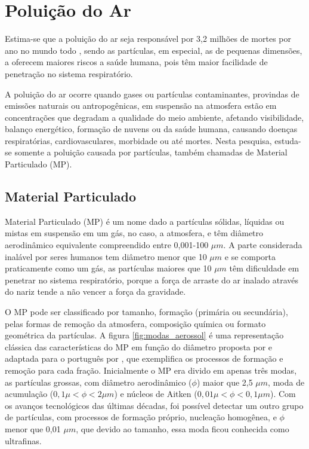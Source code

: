 \newpage
\section{Poluição do Ar}

Estima-se que a poluição do ar seja responsável por 3,2 milhões de mortes 
por ano no mundo todo \citep{lim2013}, sendo as partículas, em especial, as 
de pequenas dimensões, a oferecem maiores riscos a saúde humana, pois têm 
maior facilidade de penetração no sistema respiratório.

A poluição do ar ocorre quando gases ou partículas contaminantes, 
provindas de emissões naturais ou antropogênicas, 
em suspensão na atmosfera estão em concentrações que degradam 
a qualidade do meio ambiente, afetando visibilidade, balanço energético, 
formação de nuvens ou da saúde humana, causando doenças respiratórias, 
cardiovasculares, morbidade ou até mortes. Nesta pesquisa, estuda-se somente 
a poluição causada por partículas, também chamadas de Material Particulado (MP).

\subsection{Material Particulado}

Material Particulado (MP) é um nome dado a partículas sólidas, líquidas ou 
mistas em suspensão em um gás, no caso, a atmosfera, e têm diâmetro 
aerodinâmico equivalente compreendido entre 0,001-100 $\mu m$. A parte 
considerada inalável por seres humanos tem diâmetro menor que 10 $\mu m$
e se comporta praticamente como um gás, as partículas maiores que 10 $\mu m$ 
têm dificuldade em penetrar no sistema respiratório, porque a força de arraste 
do ar inalado através do nariz tende a não vencer a força da gravidade.

O MP pode ser classificado por tamanho, formação (primária ou secundária), 
pelas formas de remoção da atmosfera, composição química ou formato 
geométrica da partículas\citep{seinfeld2012}. A figura \ref{fig:modas_aerossol} 
é uma representação clássica das características 
do MP em função do diâmetro proposta por \citet{finlayson1999} e adaptada 
para o português por \citet{oliveira2007}, que exemplifica os processos de 
formação e remoção para cada fração. Inicialmente o MP era divido em apenas 
três modas, as partículas grossas, com  diâmetro  aerodinâmico ($\phi$) 
maior que 2,5 $\mu m$, moda de acumulação ($ 0,1\mu <\phi< 2\mu m$) e 
núcleos de Aitken ($ 0,01\mu <\phi< 0,1\mu m$). Com os avanços tecnológicos
das últimas décadas, foi possível detectar um outro grupo de partículas,
com processos de formação próprio, nucleação homogênea, e $\phi$ menor que 
0,01 $\mu m$, que devido ao tamanho, essa moda ficou conhecida como ultrafinas.

